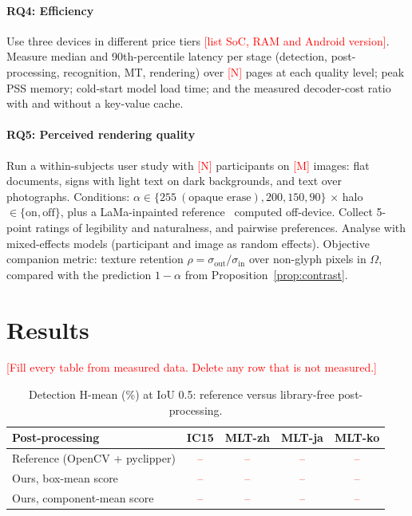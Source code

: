 \documentclass[journal]{IEEEtran}
\newcommand{\tbd}[1][--]{\textcolor{red}{#1}}
\newcommand{\note}[1]{\textcolor{red}{[#1]}}
\newcommand{\tbd}[1][--]{#1}
\newcommand{\note}[1]{}
\theoremstyle{definition}
\begin{document}
\paragraph{RQ4: Efficiency}
Use three devices in different price tiers \note{list SoC, RAM and Android
version}. Measure median and 90th-percentile latency per stage (detection, post-processing,
recognition, MT, rendering) over \note{N} pages at each quality level; peak
PSS memory; cold-start model load time; and the measured decoder-cost ratio
with and without a key-value cache.

\paragraph{RQ5: Perceived rendering quality}
Run a within-subjects user study with \note{N} participants on
\note{M} images: flat documents, signs with light text on dark backgrounds, and
text over photographs. Conditions:
$\alpha\in\{255\ (\text{opaque erase}),200,150,90\}$ $\times$
halo $\in\{\text{on},\text{off}\}$, plus a LaMa-inpainted
reference~\cite{suvorov2022lama} computed off-device. Collect 5-point ratings
of legibility and naturalness, and pairwise preferences. Analyse with
mixed-effects models (participant and image as random effects). Objective
companion metric: texture retention
$\rho=\sigma_{\mathrm{out}}/\sigma_{\mathrm{in}}$ over non-glyph pixels in
$\Omega$, compared with the prediction $1-\alpha$ from
Proposition~\ref{prop:contrast}.

\section{Results}\label{sec:results}
\note{Fill every table from measured data. Delete any row that is not measured.}

\begin{table}[t]
\centering
\caption{Detection H-mean (\%) at IoU 0.5: reference versus library-free post-processing.}
\label{tab:det}
\begin{tabular}{lcccc}
\toprule
Post-processing & IC15 & MLT-zh & MLT-ja & MLT-ko\\
\midrule
Reference (OpenCV + pyclipper) & \tbd & \tbd & \tbd & \tbd\\
Ours, box-mean score           & \tbd & \tbd & \tbd & \tbd\\
Ours, component-mean score     & \tbd & \tbd & \tbd & \tbd\\
\bottomrule
\end{tabular}
\end{table}
\end{document}
